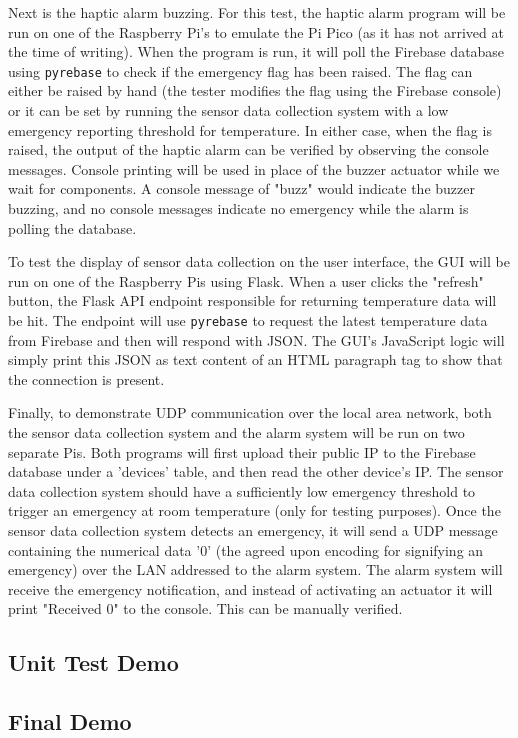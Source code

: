 Next is the haptic alarm buzzing. For this test, the haptic alarm program will be run on one of the Raspberry Pi's to
emulate the Pi Pico (as it has not arrived at the time of writing). When the program is run, it will poll the Firebase
database using \texttt{pyrebase} to check if the emergency flag has been raised. The flag can either be raised by hand
(the tester modifies the flag using the Firebase console) or it can be set by running the sensor data collection system
with a low emergency reporting threshold for temperature. In either case, when the flag is raised, the output of the
haptic alarm can be verified by observing the console messages. Console printing will be used in place of the buzzer
actuator while we wait for components. A console message of "buzz" would indicate the buzzer buzzing, and no console
messages indicate no emergency while the alarm is polling the database.

To test the display of sensor data collection on the user interface, the GUI will be run on one of the Raspberry Pis
using Flask. When a user clicks the "refresh" button, the Flask API endpoint responsible for returning temperature data
will be hit. The endpoint will use \texttt{pyrebase} to request the latest temperature data from Firebase and then will
respond with JSON. The GUI's JavaScript logic will simply print this JSON as text content of an HTML paragraph tag to
show that the connection is present.

Finally, to demonstrate UDP communication over the local area network, both the sensor data collection system and the
alarm system will be run on two separate Pis. Both programs will first upload their public IP to the Firebase database
under a 'devices' table, and then read the other device's IP. The sensor data collection system should have a
sufficiently low emergency threshold to trigger an emergency at room temperature (only for testing purposes). Once the
sensor data collection system detects an emergency, it will send a UDP message containing the numerical data '0' (the
agreed upon encoding for signifying an emergency) over the LAN addressed to the alarm system. The alarm system will
receive the emergency notification, and instead of activating an actuator it will print "Received 0" to the console.
This can be manually verified.

\subsection{Unit Test Demo}

\subsection{Final Demo}
